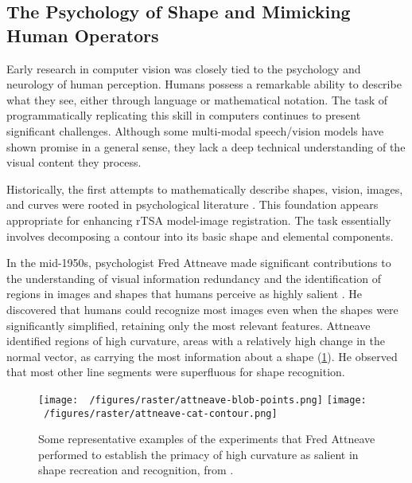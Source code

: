 \subsection{The Psychology of Shape and Mimicking Human Operators}
Early research in computer vision was closely tied to the psychology and neurology of human perception.
Humans possess a remarkable ability to describe what they see, either through language or mathematical notation.
The task of programmatically replicating this skill in computers continues to present significant challenges.
Although some multi-modal speech/vision models have shown promise in a general sense, they lack a deep technical understanding of the visual content they process.


Historically, the first attempts to mathematically describe shapes, vision, images, and curves were rooted in psychological literature \cite{attneaveInformationalAspectsVisual1954,attneaveQuantitativeStudyShape1956,koenderinkStructureImages1984,koenderinkSurfaceShapeCurvature1992}.
This foundation appears appropriate for enhancing rTSA model-image registration.
The task essentially involves decomposing a contour into its basic shape and elemental components.

In the mid-1950s, psychologist Fred Attneave made significant contributions to the understanding of visual information redundancy and the identification of regions in images and shapes that humans perceive as highly salient \cite{attneaveQuantitativeStudyShape1956,attneaveInformationalAspectsVisual1954}.
He discovered that humans could recognize most images even when the shapes were significantly simplified, retaining only the most relevant features.
Attneave identified regions of high curvature, areas with a relatively high change in the normal vector, as carrying the most information about a shape (\cref{fig:attneave}).
He observed that most other line segments were superfluous for shape recognition.


\begin{figure}[h!]
  \centering
  \texttt{[image: ~/figures/raster/attneave-blob-points.png]}
  \texttt{[image: ~/figures/raster/attneave-cat-contour.png]}
  \caption{Some representative examples of the experiments that Fred Attneave performed to establish the primacy of high curvature as salient in shape recreation and recognition, from \cite{attneaveInformationalAspectsVisual1954}.}
  \label{fig:attneave}
\end{figure}

